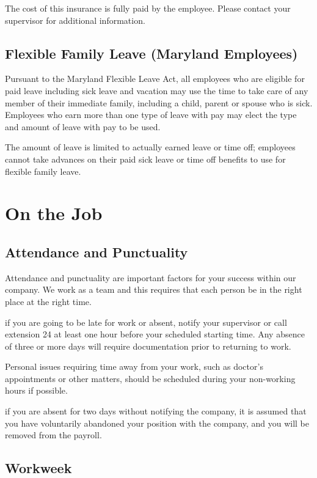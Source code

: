 The cost of this insurance is fully paid by the employee. Please contact your supervisor for additional information.

\subsection{Flexible Family Leave (Maryland Employees)}

Pursuant to the Maryland Flexible Leave Act, all employees who are eligible for paid leave including sick leave and vacation may use the time to take care of any member of their immediate family, including a child, parent or spouse who is sick. Employees who earn more than one type of leave with pay may elect the type and amount of leave with pay to be used.

The amount of leave is limited to actually earned leave or time off; employees cannot take advances on their paid sick leave or time off benefits to use for flexible family leave.

\section{On the Job}

\subsection{Attendance and Punctuality}

Attendance and punctuality are important factors for your success within our company. We work as a team and this requires that each person be in the right place at the right time.

if you are going to be late for work or absent, notify your supervisor or call extension 24 at least one hour before your scheduled starting time. Any absence of three or more days will require documentation prior to returning to work.

Personal issues requiring time away from your work, such as doctor's appointments or other matters, should be scheduled during your non-working hours if possible.

if you are absent for two days without notifying the company, it is assumed that you have voluntarily abandoned your position with the company, and you will be removed from the payroll.

\subsection{Workweek}

